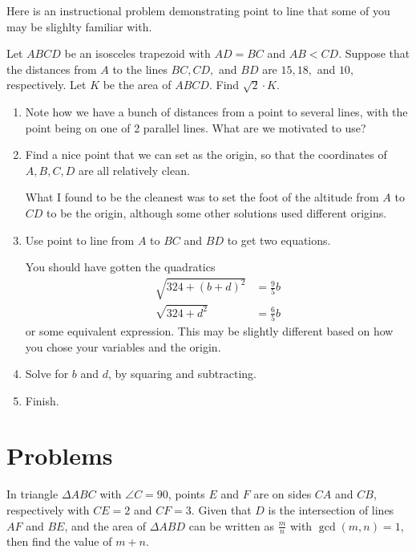 \documentclass{article}
\begin{document}
Here is an instructional problem demonstrating point to line that some of you may be slighlty familiar with. 
\begin{exam}[AIME I 2021/9]
Let $ABCD$ be an isosceles trapezoid with $AD=BC$ and $AB<CD.$ Suppose that the distances from $A$ to the lines $BC,CD,$ and $BD$ are $15,18,$ and $10,$ respectively. Let $K$ be the area of $ABCD.$ Find $\sqrt2 \cdot K.$
\end{exam}

\begin{walk}

\begin{enumerate}
    \item Note how we have a bunch of distances from a point to several lines, with the point being on one of 2 parallel lines. What are we motivated to use?
    \item Find a nice point that we can set as the origin, so that the coordinates of $A,B,C,D$ are all relatively clean.
    
    What I found to be the cleanest was to set the foot of the altitude from $A$ to $CD$ to be the origin, although some other solutions used different origins. 
    
    \item Use point to line from $A$ to $BC$ and $BD$ to get two equations.
    
    You should have gotten the quadratics 
    \begin{align*}
        \sqrt{324+(b+d)^2}&=\frac{9}{5}b\\
        \sqrt{324+d^2}&=\frac{6}{5}b
    \end{align*}
    or some equivalent expression. This may be slightly different based on how you chose your variables and the origin. 
    \item Solve for $b$ and $d$, by squaring and subtracting. 
    \item Finish. 
\end{enumerate}

\end{walk}

\pagebreak
\section{Problems}



\begin{prob}[MATHCOUNTS 2008]{2}
In triangle $\Delta ABC$ with $\angle C = 90$, points $E$ and $F$ are on sides $CA$ and $CB$, respectively with $CE=2$ and $CF=3$. Given that $D$ is the intersection of lines $AF$ and $BE$, and the area of $\Delta ABD$ can be written as $\frac{m}{n}$ with $\gcd(m,n)=1$, then find the value of $m+n$.
\end{prob}
\end{document}
